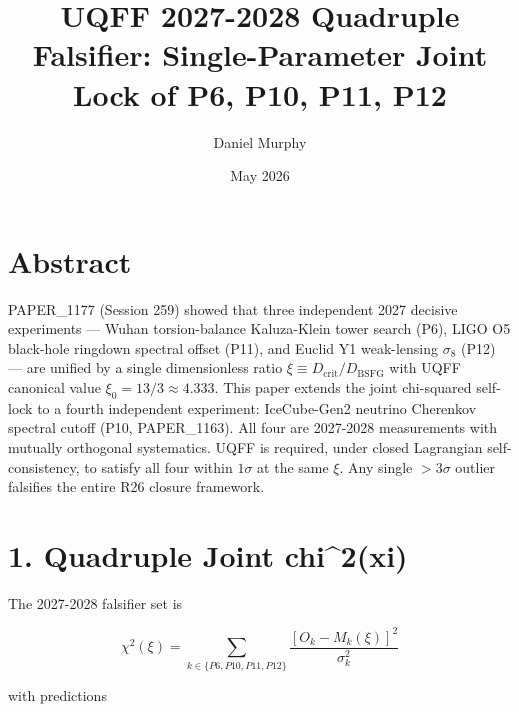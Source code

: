 \documentclass[
  11pt,
]{article}
\title{UQFF 2027-2028 Quadruple Falsifier: Single-Parameter Joint Lock
of P6, P10, P11, P12}
\author{Daniel Murphy}
\date{May 2026}
\begin{document}
\maketitle

\section{Abstract}\label{abstract}

PAPER\_1177 (Session 259) showed that three independent 2027 decisive
experiments --- Wuhan torsion-balance Kaluza-Klein tower search (P6),
LIGO O5 black-hole ringdown spectral offset (P11), and Euclid Y1
weak-lensing \(\sigma_8\) (P12) --- are unified by a single
dimensionless ratio \(\xi \equiv D_{\mathrm{crit}}/D_{\mathrm{BSFG}}\)
with UQFF canonical value \(\xi_0 = 13/3 \approx 4.333\). This paper
extends the joint chi-squared self-lock to a fourth independent
experiment: IceCube-Gen2 neutrino Cherenkov spectral cutoff (P10,
PAPER\_1163). All four are 2027-2028 measurements with mutually
orthogonal systematics. UQFF is required, under closed Lagrangian
self-consistency, to satisfy all four within \(1\sigma\) at the same
\(\xi\). Any single \(> 3\sigma\) outlier falsifies the entire R26
closure framework.

\section{1. Quadruple Joint chi\^{}2(xi)}\label{quadruple-joint-chi2xi}

The 2027-2028 falsifier set is

\[
\chi^2(\xi) = \sum_{k \in \{P6, P10, P11, P12\}} \frac{[O_k - M_k(\xi)]^2}{\sigma_k^2}
\]

with predictions
\end{document}

